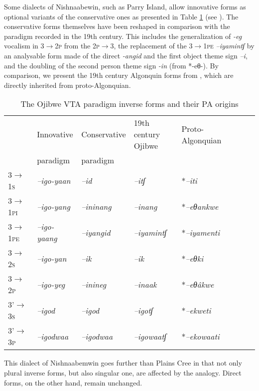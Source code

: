 \documentclass[twoside,a4paper,11pt]{article}
\newcommand{\ipa}[1]{{\phon\textit{#1}}}
\newcommand{\grise}[1]{\cellcolor{lightgray}\textbf{#1}}
\newcommand{\Σ}{\greek{Σ}}
\begin{document}
Some dialects of Nishnaabewin,  such as Parry Island, allow innovative forms as optional variants of the conservative ones as presented in Table \ref{tab:ojibwe.vta.2} (see \citealt[178-9]{valentine01grammar}). The conservative forms themselves have been reshaped in comparison with the paradigm recorded in the 19th century. This includes the generalization of \ipa{-eg} vocalism in \textsc{3$\rightarrow$2p}  from the \textsc{2p$\rightarrow$3}, the replacement of the \textsc{3$\rightarrow$1pe}  \ipa{--iyamintʃ}  by an analysable form made of the direct \ipa{-angid} and the first object theme sign \ipa{--i}, and the doubling of the second person theme sign \ipa{-in} (from *-eθ-). By comparison, we present the 19th century Algonquin forms from \citet[51]{cuoq1866}, which are directly inherited from proto-Algonquian.

\begin{table}[H]
\caption{The Ojibwe VTA paradigm inverse forms and their PA origins}
\centering \label{tab:ojibwe.vta.2}
\begin{tabular}{llllllll}
\toprule
& Innovative & Conservative & 19th century Ojibwe & Proto-Algonquian \\
&paradigm & paradigm&\\
\midrule
\textsc{3$\rightarrow$1s} &\ipa{--igo-yaan} \grise{}& 	\ipa{--id} & \ipa{--itʃ} &	 *\ipa{--iti} & 		\\
\textsc{3$\rightarrow$1pi} & 	\ipa{--igo-yang} \grise{}& 	\ipa{--ininang}  \grise{} &  	\ipa{--inang}  	 &*\ipa{--eθankwe} & 		\\
\textsc{3$\rightarrow$1pe} & 	\ipa{--igo-yaang} \grise{}& 	\ipa{--iyangid} \grise{}&	\ipa{--iyamintʃ}  &  *\ipa{--iyamenti} & 		\\
\midrule
\textsc{3$\rightarrow$2s} & 	\ipa{--igo-yan} \grise{}& 	\ipa{--ik} &	\ipa{--ik} &  *\ipa{--eθki} & 		\\
\textsc{3$\rightarrow$2p} & \ipa{--igo-yeg} \grise{}& 	\ipa{--inineg}  \grise{} & \ipa{--inaak}  & *\ipa{--eθâkwe} & 		\\
\midrule
3'\textsc{$\rightarrow$3s} & \ipa{--igod} & 	\ipa{--igod} &		\ipa{--igotʃ} &*\ipa{--ekweti} & 		\\
3'\textsc{$\rightarrow$3p} & \ipa{--igodwaa}   & 	\ipa{--igodwaa}  \grise{}&\ipa{--igowaatʃ} &*\ipa{--ekowaati} & 		\\
\bottomrule
\end{tabular}
\end{table}

This dialect of Nishnaabemwin goes further than Plains Cree in that not only plural inverse forms, but also singular one, are affected by the analogy. Direct forms, on the other hand, remain unchanged.
\end{document}
